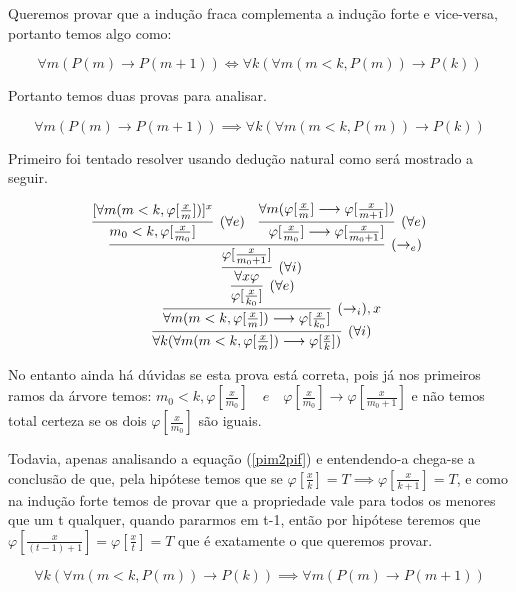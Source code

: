 \documentclass[a4paper, 10pt]{article}
\begin{document}
Queremos provar que a indução fraca complementa a indução forte e vice-versa, portanto temos algo como:

$$
    \forall{m}(P(m) \longrightarrow P(m+1)) \iff \forall{k}(\forall{m}(m < k, P(m)) \longrightarrow P(k))
$$

Portanto temos duas provas para analisar.

\begin{equation}
\label{pim2pif}
    \forall{m}(P(m) \longrightarrow P(m+1)) \implies \forall{k}(\forall{m}(m < k, P(m)) \longrightarrow P(k))
\end{equation}

Primeiro foi tentado resolver usando dedução natural como será mostrado a seguir.


$$
\infer[(\forall{i})] {\forall{k}(\forall{m}(m < k, \varphi[\frac{x}{m}])\longrightarrow\varphi[\frac{x}{k}])} {
    \infer[(\rightarrow_i), x] {\forall{m}(m < k, \varphi[\frac{x}{m}])\longrightarrow \varphi[\frac{x}{k_0}]} {
        \infer[(\forall{e})] {\varphi[\frac{x}{k_0}]} {
            \infer[(\forall{i})] {\forall{x}\varphi} {
                \infer[(\rightarrow_e)] {\varphi[\frac{x}{m_0+1}]} {
                    \infer[(\forall{e})] {m_0 < k, \varphi[\frac{x}{m_0}]} {
                        {[\forall{m}(m < k, \varphi[\frac{x}{m}])]^x}
                    }
                    & \infer[(\forall{e})] {\varphi[\frac{x}{m_0}] \longrightarrow \varphi[\frac{x}{m_0+1}]} {
                        \forall{m}(\varphi[\frac{x}{m}] \longrightarrow \varphi[\frac{x}{m+1}])
                    }
                }
            }
        }
    }
}
$$

No entanto ainda há dúvidas se esta prova está correta, pois já nos primeiros ramos da árvore temos: $m_0 < k, \varphi[\frac{x}{m_0}] \quad e \quad \varphi[\frac{x}{m_0}]\longrightarrow\varphi[\frac{x}{m_0+1}]$ e não temos total certeza se os dois $\varphi[\frac{x}{m_0}]$ são iguais.

Todavia, apenas analisando a equação (\ref{pim2pif}) e entendendo-a chega-se a conclusão de que, pela hipótese temos que se $\varphi[\frac{x}{k}] = T \implies \varphi[\frac{x}{k+1}] = T$, e como na indução forte temos de provar que a propriedade vale para todos os menores que um t qualquer, quando pararmos em t-1, então por hipótese teremos que $\varphi[\frac{x}{(t-1)+1}] = \varphi[\frac{x}{t}] = T$ que é exatamente o que queremos provar.

\begin{equation}
\label{pif2pim}
    \forall{k}(\forall{m}(m < k, P(m)) \longrightarrow P(k)) \implies \forall{m}(P(m) \longrightarrow P(m+1))
\end{equation}
\end{document}
